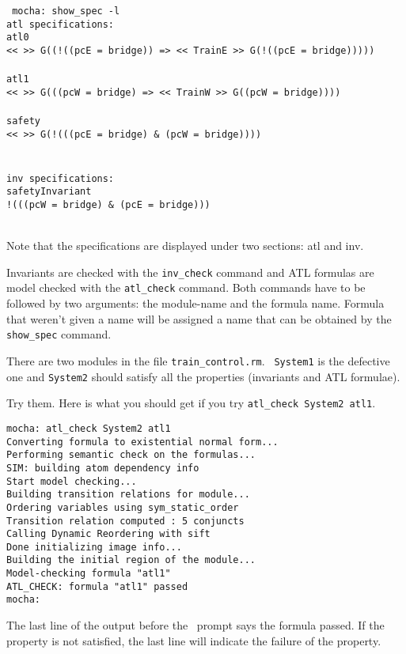 \mypar
{\tt
mocha: show\_spec -l\\
atl specifications:\\
atl0\\
<<  >> G((!((pcE = bridge)) => << TrainE >> G(!((pcE = bridge)))))\\
\\
atl1\\
<<  >> G(((pcW = bridge) => << TrainW >> G((pcW = bridge))))\\
\\
safety\\
<<  >> G(!(((pcE = bridge) \& (pcW = bridge))))\\
\\
\\
inv specifications:\\
safetyInvariant\\
!(((pcW = bridge) \& (pcE = bridge)))\\
\\

}

\mypar
Note that the specifications are displayed under two sections: atl and inv. 

Invariants are checked with the {\tt inv\_check} command and ATL
formulas are model checked with the {\tt atl\_check} command. Both
commands have to be followed by two arguments: the module-name and the
formula name. Formula that weren't given a name will be assigned a
name that can be obtained by the {\tt show\_spec} command. 

There are two modules in the file {\tt train\_control.rm}. {\tt
System1} is the defective one and {\tt System2} should satisfy all the
properties (invariants and ATL formulae). 

Try them. Here is what you should get if you try {\tt atl\_check
System2 atl1}. 
\begin{verbatim}
mocha: atl_check System2 atl1
Converting formula to existential normal form...
Performing semantic check on the formulas...
SIM: building atom dependency info
Start model checking...
Building transition relations for module...
Ordering variables using sym_static_order
Transition relation computed : 5 conjuncts
Calling Dynamic Reordering with sift
Done initializing image info...
Building the initial region of the module...
Model-checking formula "atl1"
ATL_CHECK: formula "atl1" passed
mocha: 
\end{verbatim}

\mypar
The last line of the output before the \mocha\ prompt says the formula
passed. If the property is not satisfied, the last line will indicate
the failure of the property.


